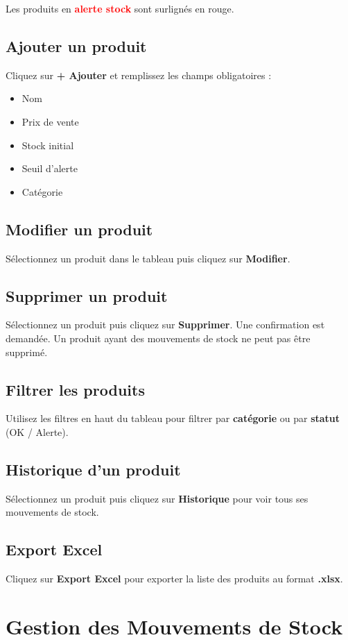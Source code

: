 \documentclass[12pt, a4paper]{article}
\begin{document}
	Les produits en \textcolor{red}{\textbf{alerte stock}} sont surlignés en rouge.
	
	\subsection{Ajouter un produit}
	Cliquez sur \textbf{+ Ajouter} et remplissez les champs obligatoires :
	\begin{itemize}
		\item Nom
		\item Prix de vente
		\item Stock initial
		\item Seuil d'alerte
		\item Catégorie
	\end{itemize}
	
	\subsection{Modifier un produit}
	Sélectionnez un produit dans le tableau puis cliquez sur \textbf{Modifier}.
	
	\subsection{Supprimer un produit}
	Sélectionnez un produit puis cliquez sur \textbf{Supprimer}. Une confirmation est demandée. Un produit ayant des mouvements de stock ne peut pas être supprimé.
	
	\subsection{Filtrer les produits}
	Utilisez les filtres en haut du tableau pour filtrer par \textbf{catégorie} ou par \textbf{statut} (OK / Alerte).
	
	\subsection{Historique d'un produit}
	Sélectionnez un produit puis cliquez sur \textbf{Historique} pour voir tous ses mouvements de stock.
	
	\subsection{Export Excel}
	Cliquez sur \textbf{Export Excel} pour exporter la liste des produits au format \textbf{.xlsx}.
	
	\section{Gestion des Mouvements de Stock}
\end{document}
